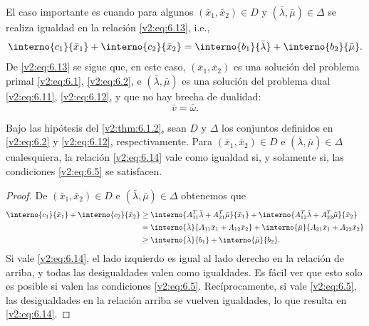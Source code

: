 El caso importante es cuando para algunos $(\bar{x}_1, \bar{x}_2) \in D$ y $(\bar{\lambda}, \bar{\mu}) \in \Delta$ se realiza igualdad en la relación \eqref{v2:eq:6.13}, i.e.,
\begin{equation}
    \interno{c_1}{\bar{x}_1} + \interno{c_2}{\bar{x}_2} = \interno{b_1}{\bar{\lambda}} + \interno{b_2}{\bar{\mu}}.
    \label{v2:eq:6.14}
\end{equation}
De \eqref{v2:eq:6.13} se sigue que, en este caso, $(\bar{x}_1, \bar{x}_2)$ es una solución del problema primal \eqref{v2:eq:6.1}, \eqref{v2:eq:6.2}, e $(\bar{\lambda}, \bar{\mu})$ es una solución del problema dual \eqref{v2:eq:6.11}, \eqref{v2:eq:6.12}, y que no hay brecha de dualidad:
\begin{equation}
    \bar{v} = \bar{\omega}.
    \label{v2:eq:6.15}
\end{equation}

\begin{lemma}\label{v2:lem:6.1.1}
    Bajo las hipótesis del \cref{v2:thm:6.1.2}, sean $D$ y $\Delta$ los conjuntos definidos en \eqref{v2:eq:6.2} y \eqref{v2:eq:6.12}, respectivamente.
    Para $(\bar{x}_1, \bar{x}_2) \in D$ e $(\bar{\lambda}, \bar{\mu}) \in \Delta$ cualesquiera, la relación \eqref{v2:eq:6.14} vale como igualdad si, y solamente si, las condiciones \eqref{v2:eq:6.5} se satisfacen.
\end{lemma}

\begin{proof}
    De $(\bar{x}_1, \bar{x}_2) \in D$ e $(\bar{\lambda}, \bar{\mu}) \in \Delta$ obtenemos que
    \begin{align*}
        \interno{c_1}{\bar{x}_1} + \interno{c_2}{\bar{x}_2} &\ge \interno{A_{11}^T \bar{\lambda} + A_{21}^T \bar{\mu}}{\bar{x}_1} + \interno{A_{12}^T \bar{\lambda} + A_{22}^T \bar{\mu}}{\bar{x}_2} \\
        &= \interno{\bar{\lambda}}{A_{11}\bar{x}_1 + A_{12}\bar{x}_2} + \interno{\bar{\mu}}{A_{21}\bar{x}_1 + A_{22}\bar{x}_2} \\
        &\ge \interno{\bar{\lambda}}{b_1} + \interno{\bar{\mu}}{b_2}.
    \end{align*}
    Si vale \eqref{v2:eq:6.14}, el lado izquierdo es igual al lado derecho en la relación de arriba, y todas las desigualdades valen como igualdades. Es fácil ver que esto solo es posible si valen las condiciones \eqref{v2:eq:6.5}. Recíprocamente, si vale \eqref{v2:eq:6.5}, las desigualdades en la relación arriba se vuelven igualdades, lo que resulta en \eqref{v2:eq:6.14}.
\end{proof}

